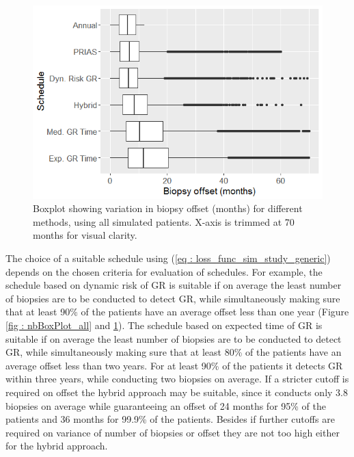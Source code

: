 \begin{figure}[!htb]
\centerline{\includegraphics[width=\columnwidth]{images/sim_study/offsetBoxPlot_all.png}}
\caption{Boxplot showing variation in biopsy offset (months) for different methods, using all simulated patients. X-axis is trimmed at 70 months for visual clarity.}
\label{fig : offsetBoxPlot_all}
\end{figure}

The choice of a suitable schedule using (\ref{eq : loss_func_sim_study_generic}) depends on the chosen criteria for evaluation of schedules. For example, the schedule based on dynamic risk of GR is suitable if on average the least number of biopsies are to be conducted to detect GR, while simultaneously making sure that at least 90\% of the patients have an average offset less than one year (Figure \ref{fig : nbBoxPlot_all} and \ref{fig : offsetBoxPlot_all}). The schedule based on expected time of GR is suitable if on average the least number of biopsies are to be conducted to detect GR, while simultaneously making sure that at least 80\% of the patients have an average offset less than two years. For at least 90\% of the patients it detects GR within three years, while conducting two biopsies on average. If a stricter cutoff is required on offset the hybrid approach may be suitable, since it conducts only 3.8 biopsies on average while guaranteeing an offset of 24 months for 95\% of the patients and 36 months for 99.9\% of the patients. Besides if further cutoffs are required on variance of number of biopsies or offset they are not too high either for the hybrid approach.